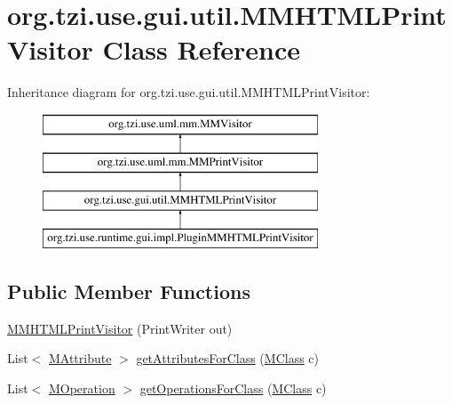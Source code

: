 \hypertarget{classorg_1_1tzi_1_1use_1_1gui_1_1util_1_1_m_m_h_t_m_l_print_visitor}{\section{org.\-tzi.\-use.\-gui.\-util.\-M\-M\-H\-T\-M\-L\-Print\-Visitor Class Reference}
\label{classorg_1_1tzi_1_1use_1_1gui_1_1util_1_1_m_m_h_t_m_l_print_visitor}
}
Inheritance diagram for org.\-tzi.\-use.\-gui.\-util.\-M\-M\-H\-T\-M\-L\-Print\-Visitor\-:\begin{figure}[H]
\begin{center}
\leavevmode
\includegraphics[height=4.000000cm]{classorg_1_1tzi_1_1use_1_1gui_1_1util_1_1_m_m_h_t_m_l_print_visitor}
\end{center}
\end{figure}
\subsection*{Public Member Functions}
\begin{DoxyCompactItemize}
\item 
\hyperlink{classorg_1_1tzi_1_1use_1_1gui_1_1util_1_1_m_m_h_t_m_l_print_visitor_aea08d348a74be878b486e23264fc0b1f}{M\-M\-H\-T\-M\-L\-Print\-Visitor} (Print\-Writer out)
\item 
List$<$ \hyperlink{classorg_1_1tzi_1_1use_1_1uml_1_1mm_1_1_m_attribute}{M\-Attribute} $>$ \hyperlink{classorg_1_1tzi_1_1use_1_1gui_1_1util_1_1_m_m_h_t_m_l_print_visitor_a9177b10643253768085091bab59d94f8}{get\-Attributes\-For\-Class} (\hyperlink{interfaceorg_1_1tzi_1_1use_1_1uml_1_1mm_1_1_m_class}{M\-Class} c)
\item 
List$<$ \hyperlink{classorg_1_1tzi_1_1use_1_1uml_1_1mm_1_1_m_operation}{M\-Operation} $>$ \hyperlink{classorg_1_1tzi_1_1use_1_1gui_1_1util_1_1_m_m_h_t_m_l_print_visitor_aac7b3ffa234b16b3f71d070dbaa14423}{get\-Operations\-For\-Class} (\hyperlink{interfaceorg_1_1tzi_1_1use_1_1uml_1_1mm_1_1_m_class}{M\-Class} c)
\end{DoxyCompactItemize}
